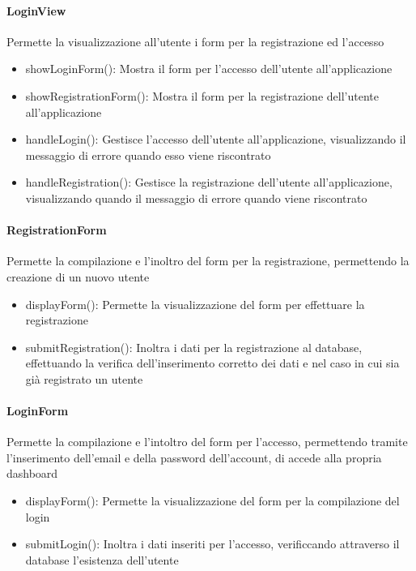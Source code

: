 \paragraph{LoginView}
Permette la visualizzazione all'utente i form per la registrazione ed l'accesso\\
\begin{itemize}
\item showLoginForm(): Mostra il form per l'accesso dell'utente all'applicazione\\
\item showRegistrationForm(): Mostra il form per la registrazione dell'utente all'applicazione\\
\item handleLogin(): Gestisce l'accesso dell'utente all'applicazione, visualizzando il messaggio di errore quando esso viene riscontrato\\
\item handleRegistration(): Gestisce la registrazione dell'utente all'applicazione, visualizzando quando il messaggio di errore quando viene riscontrato\\
\end{itemize}

\paragraph{RegistrationForm}
Permette la compilazione e l'inoltro del form per la registrazione, permettendo la creazione di un nuovo utente\\
\begin{itemize}
\item displayForm(): Permette la visualizzazione del form per effettuare la registrazione\\
\item submitRegistration(): Inoltra i dati per la registrazione al database, effettuando la verifica dell'inserimento corretto dei dati e nel caso in cui sia già registrato un utente\\
\end{itemize}

\paragraph{LoginForm}
Permette la compilazione e l'intoltro del form per l'accesso, permettendo tramite l'inserimento dell'email e della password dell'account, di accede alla propria dashboard
\begin{itemize}
\item displayForm(): Permette la visualizzazione del form per la compilazione del login
\item submitLogin(): Inoltra i dati inseriti per l'accesso, verificcando attraverso il database l'esistenza dell'utente
\end{itemize}


